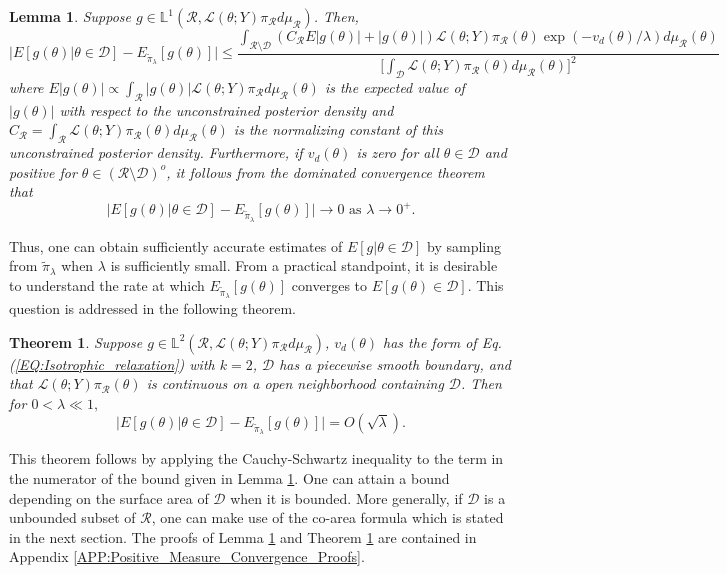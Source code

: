 \documentclass[10pt,fleqn]{article}
\newtheorem{theorem}{Theorem}
\newtheorem{lemma}{Lemma}
\DeclareMathOperator{\1}{\mathbbm{1}}
\begin{document}
\begin{lemma}
\label{THM:positive_measure_approximation_error}
Suppose $g \in \mathbb{L}^1(\mathcal{R}, \mathcal{L}(\theta;Y)\pi_\mathcal{R}d\mu_\mathcal{R})$.  Then,
$$\bigg|E[g(\theta) |\theta\in\mathcal{D}] - E_{\tilde{\pi}_\lambda}[g(\theta)]   \bigg| \le \frac{\int_{\mathcal{R}\setminus \mathcal{D}} (C_\mathcal{R}E|g(\theta)|+|g(\theta)|) \mathcal{L}(\theta; Y) \pi_\mathcal{R}(\theta)\exp(-v_d(\theta)/\lambda ) d\mu_\mathcal{R}(\theta)}{\big[\int_\mathcal{D} \mathcal{L}(\theta; Y) \pi_\mathcal{R}(\theta)d\mu_\mathcal{R}(\theta)\big]^2 }$$
where $E|g(\theta)| \propto \int_\mathcal{R} |g(\theta)| \mathcal{L}(\theta;Y)\pi_\mathcal{R} d\mu_\mathcal{R}(\theta)$ is the expected value of $|g(\theta)|$ with respect to the unconstrained posterior density and $C_\mathcal{R} = \int_\mathcal{R} \mathcal{L}(\theta;Y)\pi_\mathcal{R}(\theta)d\mu_\mathcal{R}(\theta)$ is the normalizing constant of this unconstrained posterior density. Furthermore, if $v_d(\theta)$ is zero for all $\theta\in\mathcal{D}$ and positive for $\theta\in(\mathcal{R}\setminus\mathcal{D})^o$, it follows from the dominated convergence theorem that $$\bigg|E[g(\theta) |\theta\in\mathcal{D}] - E_{\tilde{\pi}_\lambda}[g(\theta)]   \bigg|\to 0 \text{ as } \lambda \to 0^+.$$
\end{lemma}

Thus, one can obtain sufficiently accurate estimates of $E[g|\theta\in\mathcal{D}]$ by sampling from $\tilde{\pi}_\lambda$ when $\lambda$ is sufficiently small.  From a practical standpoint, it is desirable to understand the rate at which $E_{\tilde{\pi}_\lambda}[g(\theta)] $ converges to $E[g(\theta)\in\mathcal{D}]$. This question is addressed in the following theorem.

\begin{theorem}
\label{THM:Positive_measure_convergence_rate}
Suppose $g \in  \mathbb{L}^2(\mathcal{R}, \mathcal{L}(\theta;Y)\pi_\mathcal{R}d\mu_\mathcal{R})$, $v_d(\theta)$ has the form of Eq. (\ref{EQ:Isotrophic_relaxation}) with $k=2$, $\mathcal{D}$ has a piecewise smooth boundary, and that $\mathcal{L}(\theta;Y)\pi_\mathcal{R}(\theta)$ is continuous on a open neighborhood containing $\mathcal{D}$.  Then for $0<\lambda \ll 1,$
$$ \bigg|E[g(\theta) |\theta\in\mathcal{D}] - E_{\tilde{\pi}_\lambda}[g(\theta)]   \bigg| = O(\sqrt{\lambda}).  $$
\end{theorem}
This theorem follows by applying the Cauchy-Schwartz inequality to the term in the numerator of the bound given in Lemma \ref{THM:positive_measure_approximation_error}.  One can attain a bound depending on the surface area of $\mathcal{D}$ when it is bounded.  More generally, if $\mathcal{D}$ is a unbounded subset of $\mathcal{R}$, one can make use of the co-area formula \cite{federer2014geometric, diaconis2013manifold} which is stated in the next section. The proofs of Lemma \ref{THM:positive_measure_approximation_error} and Theorem \ref{THM:Positive_measure_convergence_rate} are contained in Appendix \ref{APP:Positive_Measure_Convergence_Proofs}.
\end{document}
